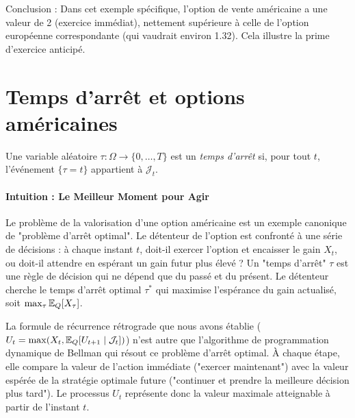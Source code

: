 Conclusion : Dans cet exemple spécifique, l'option de vente américaine a une valeur de 2 (exercice immédiat), nettement supérieure à celle de l'option européenne correspondante (qui vaudrait environ 1.32). Cela illustre la prime d'exercice anticipé.

\section{Temps d'arrêt et options américaines}

\begin{definition}
Une variable aléatoire $\tau : \Omega \to \{0,\dots,T\}$ est un \emph{temps d'arrêt} si,
pour tout $t$, l'événement $\{\tau = t\}$ appartient à $\mathcal{J}_t$.
\end{definition}

\paragraph*{Intuition : Le Meilleur Moment pour Agir}
Le problème de la valorisation d'une option américaine est un exemple canonique de "problème d'arrêt optimal". Le détenteur de l'option est confronté à une série de décisions : à chaque instant $t$, doit-il exercer l'option et encaisser le gain $X_t$, ou doit-il attendre en espérant un gain futur plus élevé ? Un "temps d'arrêt" $\tau$ est une règle de décision qui ne dépend que du passé et du présent. Le détenteur cherche le temps d'arrêt optimal $\tau^*$ qui maximise l'espérance du gain actualisé, soit $\max_\tau \mathbb{E}_Q[X_\tau]$.

La formule de récurrence rétrograde que nous avons établie ($U_t = \max(X_t, \mathbb{E}_Q[U_{t+1} \mid \mathcal{J}_t])$) n'est autre que l'algorithme de programmation dynamique de Bellman qui résout ce problème d'arrêt optimal. À chaque étape, elle compare la valeur de l'action immédiate ("exercer maintenant") avec la valeur espérée de la stratégie optimale future ("continuer et prendre la meilleure décision plus tard"). Le processus $U_t$ représente donc la valeur maximale atteignable à partir de l'instant $t$.

